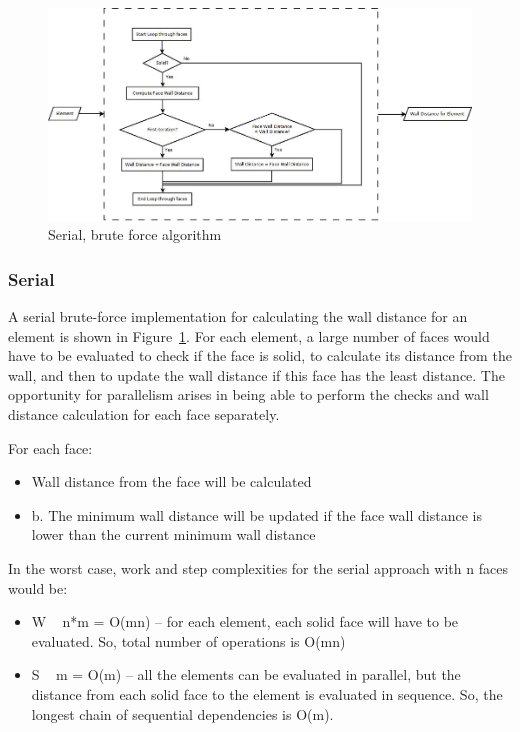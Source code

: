 \documentclass[]{aiaa-tc}%
\begin{document}
\begin{figure}
  \includegraphics{figures/brute_force/bf_serial_block}
  \caption{Serial, brute force algorithm}
  \label{f:bf_serial}
\end{figure}

\subsubsection{Serial}
A serial brute-force implementation for calculating the wall distance
for an element is shown in Figure~\ref{f:bf_serial}. For each element, a large number of faces would have to be evaluated to check if the face is solid, to calculate its distance from the wall, and then to update the wall distance if this face has the least distance. The opportunity for parallelism arises in being able to perform the checks and wall distance calculation for each face separately.

For each face:
\begin{itemize}
  \item Wall distance from the face will be calculated
  \item b.	The minimum wall distance will be updated if the face wall distance is lower than the current minimum wall distance
\end{itemize}

In the worst case, work and step complexities for the serial approach
with n faces would be:

\begin{itemize}
  \item W ~ n*m = O(mn) – for each element, each solid face will have to be evaluated.  So, total number of operations is O(mn)
  \item S ~ m = O(m) – all the elements can be evaluated in parallel, but the distance from each solid face to the element is evaluated in sequence.  So, the longest chain of sequential dependencies is O(m).
\end{itemize}
\end{document}

